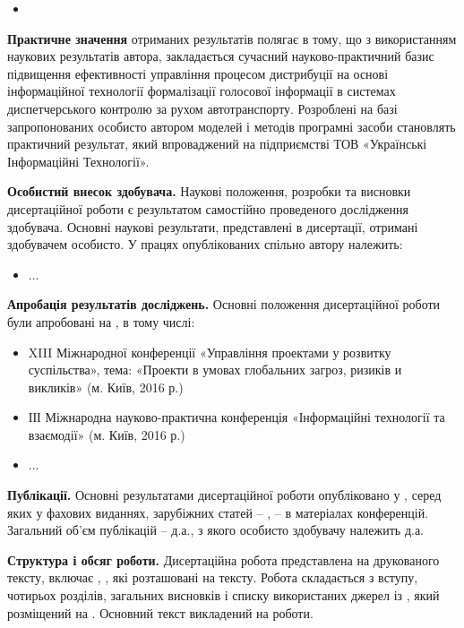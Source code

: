 \begin{itemize}
	\item {}
\end{itemize}

\textbf{Практичне значення} отриманих результатів полягає в тому, що з використанням наукових результатів автора, закладається сучасний науково-практичний базис підвищення ефективності управління процесом дистрибуції на основі інформаційної технології формалізації голосової інформації в системах диспетчерського контролю за рухом автотранспорту. Розроблені на базі запропонованих особисто автором моделей і методів програмні засоби становлять практичний результат, який впроваджений на підприємстві ТОВ «Українські Інформаційні Технології».

\textbf{Особистий внесок здобувача.} Наукові положення, розробки та висновки дисертаційної роботи є результатом самостійно проведеного дослідження здобувача. Основні наукові результати, представлені в дисертації, отримані здобувачем особисто. У працях опублікованих спільно автору належить:

\begin{itemize}
	\item ...
\end{itemize}

\textbf{Апробація результатів досліджень.} Основні положення дисертаційної роботи були апробовані на , в тому числі:

\begin{itemize}
	\item XIII Міжнародної конференції «Управління проектами у розвитку суспільства», тема: «Проекти в умовах глобальних загроз, ризиків и викликів» (м. Київ, 2016 р.)
	\item ІІІ Міжнародна науково-практична конференція «Інформаційні технології та взаємодії» (м. Київ, 2016 р.)
	\item ...
\end{itemize}

\textbf{Публікації.} Основні результатами дисертаційної роботи опубліковано у , серед яких  у фахових виданнях, зарубіжних статей – ,  – в матеріалах конференцій. Загальний об’єм публікацій –  д.а., з якого особисто здобувачу належить  д.а.

\textbf{Структура і обсяг роботи.} Дисертаційна робота представлена на  друкованого тексту, включає , , які розташовані на  тексту. Робота складається з вступу, чотирьох розділів, загальних висновків і списку використаних джерел із , який розміщений на . Основний текст викладений на  роботи.
